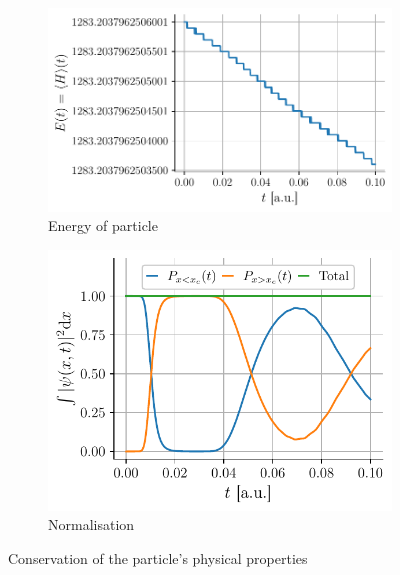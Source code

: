 \begin{figure}[h]
    \centering
    \begin{subfigure}{0.55\linewidth}
        \centering
        \includegraphics[width=\linewidth]{figures/i_conservation_energy.pdf}
        \caption{Energy of particle}
        \label{fig:i_conservation_energy}
    \end{subfigure}
    \begin{subfigure}{0.44\linewidth}
        \centering
        \includegraphics[width=\linewidth]{figures/i_conservation_probability.pdf}
        \caption{Normalisation}
        \label{fig:i_conservation_probability}
    \end{subfigure}
    \caption{Conservation of the particle's physical properties}
    \label{fig:i_conservation}
\end{figure}

